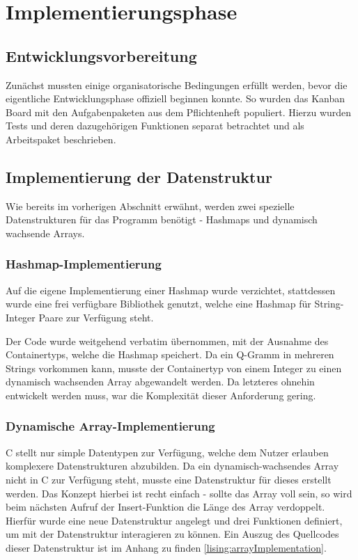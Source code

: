 \section{Implementierungsphase}
\label{section:implementierungsphase}
\subsection{Entwicklungsvorbereitung}
Zunächst mussten einige organisatorische Bedingungen erfüllt werden, bevor die eigentliche Entwicklungsphase offiziell beginnen konnte. So wurden das Kanban Board mit den
Aufgabenpaketen aus dem Pflichtenheft populiert. Hierzu wurden Tests und deren
dazugehörigen Funktionen separat betrachtet und als Arbeitspaket beschrieben.

\subsection{Implementierung der Datenstruktur}
Wie bereits im vorherigen Abschnitt erwähnt, werden zwei spezielle Datenstrukturen für das Programm benötigt - Hashmaps und dynamisch wachsende Arrays.

\subsubsection{Hashmap-Implementierung}


Auf die eigene Implementierung einer Hashmap wurde verzichtet, stattdessen wurde
eine frei verfügbare Bibliothek genutzt, welche eine Hashmap für
String-Integer Paare zur Verfügung steht.

Der Code wurde weitgehend verbatim übernommen, mit der Ausnahme des
Containertyps, welche die Hashmap speichert. Da ein Q-Gramm in mehreren Strings
vorkommen kann, musste der Containertyp von einem Integer zu einen dynamisch
wachsenden Array abgewandelt werden. Da letzteres ohnehin entwickelt werden muss,
war die Komplexität dieser Anforderung gering.

\subsubsection{Dynamische Array-Implementierung}
C stellt nur simple Datentypen zur Verfügung, welche dem Nutzer erlauben komplexere Datenstrukturen abzubilden. Da ein dynamisch-wachsendes
Array nicht in C zur Verfügung steht, musste eine Datenstruktur für dieses erstellt werden.
Das Konzept hierbei ist recht einfach - sollte das Array voll sein, so wird beim
nächsten Aufruf der Insert-Funktion die Länge des Array verdoppelt. Hierfür wurde eine neue Datenstruktur angelegt und drei Funktionen definiert, um mit der Datenstruktur interagieren zu können. Ein Auszug des Quellcodes dieser Datenstruktur ist im Anhang zu finden \ref{lising:arrayImplementation}.\par

\clearpage